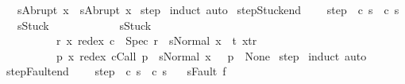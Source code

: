 \begin{isabellebody}
\ \ \ {\isachardoublequoteopen}s{\isacharprime}{\isacharequal}Abrupt\ x\ {\isasymLongrightarrow}\ s{\isacharequal}Abrupt\ x{\isachardoublequoteclose}\isanewline
%
\isadelimproof
%
\endisadelimproof
%
\isatagproof
{}\isamarkupfalse%
\ step\isanewline
{}\isamarkupfalse%
\ induct\ auto%
\endisatagproof
{\isafoldproof}%
%
\isadelimproof
\isanewline
%
\endisadelimproof
\isanewline
{}\isamarkupfalse%
\ step{\isacharunderscore}Stuck{\isacharunderscore}end{\isacharcolon}\ \isanewline
\ \ \ step{\isacharcolon}\ {\isachardoublequoteopen}{\isasymGamma}{\isasymturnstile}\ {\isacharparenleft}c\ s{\isacharparenright}\ {\isasymrightarrow}\ {\isacharparenleft}c\ s{\isacharprime}{\isacharparenright}{\isachardoublequoteclose}\isanewline
\ \ \ {\isachardoublequoteopen}s{\isacharprime}{\isacharequal}Stuck\ {\isasymLongrightarrow}\ \isanewline
\ \ \ \ \ \ \ \ \ \ s{\isacharequal}Stuck\ {\isasymor}\ \isanewline
\ \ \ \ \ \ \ \ \ \ {\isacharparenleft}{\isasymexists}r\ x{\isachardot}\ redex\ c\ {\isacharequal}\ Spec\ r\ {\isasymand}\ s{\isacharequal}Normal\ x\ {\isasymand}\ {\isacharparenleft}{\isasymforall}t{\isachardot}\ {\isacharparenleft}x{\isacharcomma}t{\isacharparenright}{\isasymnotin}r{\isacharparenright}{\isacharparenright}\ {\isasymor}\ \isanewline
\ \ \ \ \ \ \ \ \ \ {\isacharparenleft}{\isasymexists}p\ x{\isachardot}\ redex\ cCall\ p\ {\isasymand}\ s{\isacharequal}Normal\ x\ {\isasymand}\ {\isasymGamma}\ p\ {\isacharequal}\ None{\isacharparenright}{\isachardoublequoteclose}\isanewline
%
\isadelimproof
%
\endisadelimproof
%
\isatagproof
{}\isamarkupfalse%
\ step\isanewline
{}\isamarkupfalse%
\ induct\ auto%
\endisatagproof
{\isafoldproof}%
%
\isadelimproof
\isanewline
%
\endisadelimproof
\isanewline
{}\isamarkupfalse%
\ step{\isacharunderscore}Fault{\isacharunderscore}end{\isacharcolon}\ \isanewline
\ \ \ step{\isacharcolon}\ {\isachardoublequoteopen}{\isasymGamma}{\isasymturnstile}\ {\isacharparenleft}c\ s{\isacharparenright}\ {\isasymrightarrow}\ {\isacharparenleft}c\ s{\isacharprime}{\isacharparenright}{\isachardoublequoteclose}\isanewline
\ \ \ {\isachardoublequoteopen}s{\isacharprime}{\isacharequal}Fault\ f\ {\isasymLongrightarrow}\ \isanewline

\end{isabellebody}
